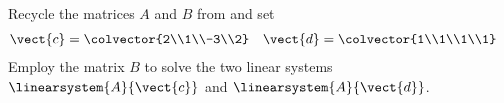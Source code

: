 Recycle the matrices $A$ and $B$ from  and set
%
\begin{align*}
\vect{c}&=\colvector{2\\1\\-3\\2}&\vect{d}&=\colvector{1\\1\\1\\1}
\end{align*}
%
Employ the matrix $B$ to solve the two linear systems $\linearsystem{A}{\vect{c}}$ and $\linearsystem{A}{\vect{d}}$.
